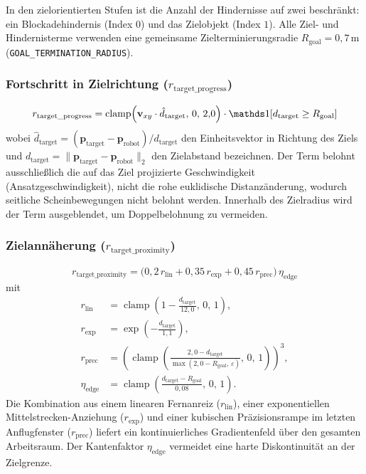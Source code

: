 In den zielorientierten Stufen ist die Anzahl der Hindernisse auf zwei beschränkt: ein Blockadehindernis (Index $0$) und das Zielobjekt (Index $1$). Alle Ziel- und Hindernisterme verwenden eine gemeinsame Zielterminierungsradie $R_{\text{goal}} = 0{,}7\,\text{m}$ (\verb|GOAL_TERMINATION_RADIUS|).

\subsubsection{Fortschritt in Zielrichtung ($r_{\text{target\_progress}}$)}
\begin{equation}\label{eq:nav_target_progress}
r_{\text{target\_progress}} = \operatorname{clamp}\!\left(\mathbf{v}_{xy}\cdot\hat{d}_{\text{target}},\, 0,\, 2{,}0\right)\cdot \ind[d_{\text{target}} \ge R_{\text{goal}}]
\end{equation}
wobei $\hat{d}_{\text{target}} = (\mathbf{p}_{\text{target}}-\mathbf{p}_{\text{robot}})/d_{\text{target}}$ den Einheitsvektor in Richtung des Ziels und $d_{\text{target}} = \lVert \mathbf{p}_{\text{target}}-\mathbf{p}_{\text{robot}}\rVert_2$ den Zielabstand bezeichnen. Der Term belohnt ausschließlich die auf das Ziel projizierte Geschwindigkeit (Ansatzgeschwindigkeit), nicht die rohe euklidische Distanzänderung, wodurch seitliche Scheinbewegungen nicht belohnt werden. Innerhalb des Zielradius wird der Term ausgeblendet, um Doppelbelohnung zu vermeiden.

\subsubsection{Zielannäherung ($r_{\text{target\_proximity}}$)}
\begin{equation}\label{eq:nav_target_prox}
r_{\text{target\_proximity}} = \Big(0{,}2\,r_{\text{lin}} + 0{,}35\,r_{\text{exp}} + 0{,}45\,r_{\text{prec}}\Big)\, \eta_{\text{edge}}
\end{equation}
mit
\begin{align}
r_{\text{lin}} &= \operatorname{clamp}\!\left(1 - \tfrac{d_{\text{target}}}{12{,}0},\,0,\,1\right), \\
r_{\text{exp}} &= \exp\!\left(-\tfrac{d_{\text{target}}}{1{,}1}\right), \\
r_{\text{prec}} &= \left(\operatorname{clamp}\!\left(\tfrac{2{,}0-d_{\text{target}}}{\max(2{,}0-R_{\text{goal}},\,\varepsilon)},\,0,\,1\right)\right)^{3}, \\
\eta_{\text{edge}} &= \operatorname{clamp}\!\left(\tfrac{d_{\text{target}}-R_{\text{goal}}}{0{,}08},\,0,\,1\right).
\end{align}
Die Kombination aus einem linearen Fernanreiz ($r_{\text{lin}}$), einer exponentiellen Mittelstrecken-Anziehung ($r_{\text{exp}}$) und einer kubischen Präzisionsrampe im letzten Anflugfenster ($r_{\text{prec}}$) liefert ein kontinuierliches Gradientenfeld über den gesamten Arbeitsraum. Der Kantenfaktor $\eta_{\text{edge}}$ vermeidet eine harte Diskontinuität an der Zielgrenze.

